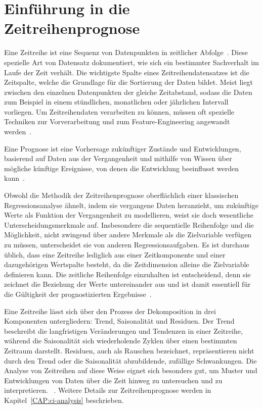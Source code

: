 \section{Einführung in die Zeitreihenprognose}\label{CAP:intor-time-series-forecasting}
Eine Zeitreihe ist eine Sequenz von Datenpunkten in zeitlicher Abfolge~\cite{Peixeiro.2022}.
Diese spezielle Art von Datensatz dokumentiert, wie sich ein bestimmter Sachverhalt im Laufe der Zeit verhält.
Die wichtigste Spalte eines Zeitreihendatensatzes ist die Zeitspalte, welche die Grundlage für die Sortierung der Daten bildet.
Meist liegt zwischen den einzelnen Datenpunkten der gleiche Zeitabstand, sodass die Daten zum Beispiel in einem stündlichen, monatlichen oder jährlichen Intervall vorliegen.
Um Zeitreihendaten verarbeiten zu können, müssen oft spezielle Techniken zur Vorverarbeitung und zum Feature-Engineering angewandt werden~\cite{Lazzeri.2021}.

Eine Prognose ist eine Vorhersage zukünftiger Zustände und Entwicklungen, basierend auf Daten aus der Vergangenheit und mithilfe von Wissen über mögliche künftige Ereignisse, von denen die Entwicklung beeinflusst werden kann~\cite{Peixeiro.2022}.

Obwohl die Methodik der Zeitreihenprognose oberflächlich einer klassischen Regressionsanalyse ähnelt, indem sie vergangene Daten heranzieht, um zukünftige Werte als Funktion der Vergangenheit zu modellieren, weist sie doch wesentliche Unterscheidungsmerkmale auf.
Insbesondere die sequentielle Reihenfolge und die Möglichkeit, nicht zwingend über andere Merkmale als die Zielvariable verfügen zu müssen, unterscheidet sie von anderen Regressionsaufgaben.
Es ist durchaus üblich, dass eine Zeitreihe lediglich aus einer Zeitkomponente und einer dazugehörigen Wertspalte besteht, da die Zeitdimension alleine die Zielvariable definieren kann.
Die zeitliche Reihenfolge einzuhalten ist entscheidend, denn sie zeichnet die Beziehung der Werte untereinander aus und ist damit essentiell für die Gültigkeit der prognostizierten Ergebnisse~\cite{Peixeiro.2022}.

Eine Zeitreihe lässt sich über den Prozess der Dekomposition in drei Komponenten untergliedern:
Trend, Saisonalität und Residuen.
Der Trend beschreibt die langfristigen Veränderungen und Tendenzen in einer Zeitreihe, während die Saisonalität sich wiederholende Zyklen über einen bestimmten Zeitraum darstellt.
Residuen, auch als Rauschen bezeichnet, repräsentieren nicht durch den Trend oder die Saisonalität abzubildende, zufällige Schwankungen.
Die Analyse von Zeitreihen auf diese Weise eignet sich besonders gut, um Muster und Entwicklungen von Daten über die Zeit hinweg zu untersuchen und zu interpretieren. ~\cite{Peixeiro.2022}.
Weitere Details zur Zeitreihenprognose werden in Kapitel~\ref{CAP:ci-analysis} beschrieben.


